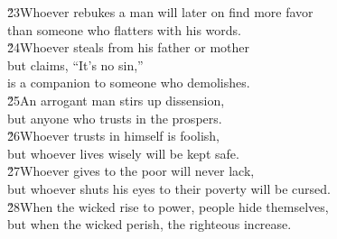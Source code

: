 \begin{poetry}
\poeml \v{23}Whoever rebukes a man will later on find more favor \\
\poemll    than someone who flatters with his words. \\
\poeml \v{24}Whoever steals from his father or mother \\
\poemll    but claims, ``It's no sin,'' \\
\poemlll       is a companion to someone who demolishes. \\
\poeml \v{25}An arrogant man stirs up dissension, \\
\poemll    but anyone who trusts in the  prospers. \\
\poeml \v{26}Whoever trusts in himself is foolish, \\
\poemll    but whoever lives wisely will be kept safe. \\
\poeml \v{27}Whoever gives to the poor will never lack, \\
\poemll    but whoever shuts his eyes to their poverty will be cursed. \\
\poeml \v{28}When the wicked rise to power, people hide themselves, \\
\poemll    but when the wicked perish, the righteous increase.
\end{poetry}

